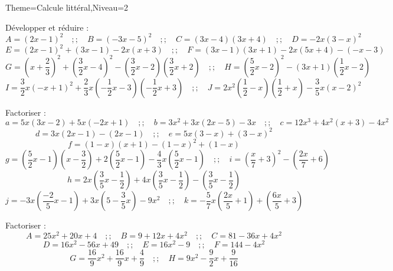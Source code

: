 \documentclass[a4paper,12pt]{article}
\begin{document}
\begin{Maquette}[Fiche]{Theme=Calcule littéral,Niveau=2}
\begin{exercice}
Développer et réduire :
\[
A=\left(2x-1\right)^{2}\quad ;; \quad
B=\left(-3x-5\right)^{2}\quad ;; \quad
C=\left(3x-4\right)\left(3x+4\right)\quad ;; \quad
D=-2x\left(3-x\right)^{2}
\]
\[
E=\left(2x-1\right)^{2}+\left(3x-1\right)-2x\left(x+3\right)\quad ;; \quad
F=\left(3x-1\right)\left(3x+1\right)-2x\left(5x+4\right)-\left(-x-3\right)
\]
\[
G=\left(x+\dfrac{2}{3}\right)^{2}+\left(\dfrac{3}{2}x-4\right)^{2}-\left(\dfrac{3}{2}x-2\right)\left(\dfrac{3}{2}x+2\right)\quad ;; \quad
H=\left(\dfrac{5}{2}x-2\right)^{2}-\left(3x+1\right)\left(\dfrac{1}{2}x-2\right)
\]
\[
I=\dfrac{3}{2}x\left(-x+1\right)^{2}+\dfrac{2}{3}x\left(-\dfrac{1}{2}x-3\right)\left(-\dfrac{1}{2}x+3\right)\quad ;; \quad
J=2x^{2}\left(\dfrac{1}{2}-x\right)\left(\dfrac{1}{2}+x\right)-\dfrac{3}{5}x\left(x-2\right)^{2}
\]
\end{exercice}

\begin{exercice}
Factoriser :
\[
a=5x\left(3x-2\right)+5x\left(-2x+1\right)\quad ;; \quad
b=3x^{2}+3x\left(2x-5\right)-3x\quad ;; \quad
c=12x^{3}+4x^{2}\left(x+3\right)-4x^{2}
\]
\[
d=3x\left(2x-1\right)-\left(2x-1\right)\quad ;; \quad
e=5x\left(3-x\right)+\left(3-x\right)^{2}
\]
\[
f=\left(1-x\right)\left(x+1\right)-\left(1-x\right)^{2}+\left(1-x\right)
\]
\[
g=\left(\dfrac{5}{2}x-1\right)\left(x-\dfrac{3}{2}\right)+2\left(\dfrac{5}{2}x-1\right)-\dfrac{4}{3}x\left(\dfrac{5}{2}x-1\right)\quad ;; \quad
i=\left(\dfrac{x}{7}+3\right)^{2}-\left(\dfrac{2x}{7}+6\right)
\]
\[
h=2x\left(\dfrac{3}{5}x-\dfrac{1}{2}\right)+4x\left(\dfrac{3}{5}x-\dfrac{1}{2}\right)-\left(\dfrac{3}{5}x-\dfrac{1}{2}\right)
\]
\[
j=-3x\left(\dfrac{-2}{5}x-1\right)+3x\left(5-\dfrac{3}{5}x\right)-9x^{2}\quad ;; \quad
k=-\dfrac{5}{7}x\left(\dfrac{2x}{5}+1\right)+\left(\dfrac{6x}{5}+3\right)
\]
\end{exercice}

\begin{exercice}
Factoriser :
\[
A=25x^{2}+20x+4\quad ;; \quad
B=9+12x+4x^{2}\quad ;; \quad
C=81-36x+4x^{2}
\]
\[
D=16x^{2}-56x+49\quad ;; \quad
E=16x^{2}-9\quad ;; \quad
F=144-4x^{2}
\]
\[
G=\dfrac{16}{9}x^{2}+\dfrac{16}{9}x+\dfrac{4}{9}\quad ;; \quad
H=9x^{2}-\dfrac{9}{2}x+\dfrac{9}{16}
\]
\end{exercice}

\end{Maquette}
\end{document}
